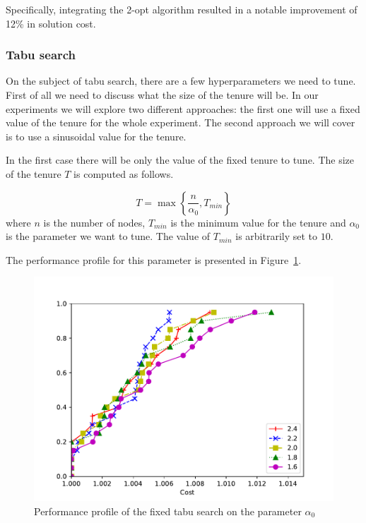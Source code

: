 \documentclass{article}
\begin{document}
Specifically, integrating the 2-opt algorithm resulted in a notable improvement of 12\% in solution cost.

\clearpage

\subsubsection{Tabu search}
On the subject of tabu search, there are a few hyperparameters we need to tune.
First of all we need to discuss what the size of the tenure will be. In our
experiments we will explore two different approaches: the first one will use
a fixed value of the tenure for the whole experiment. The second approach we
will cover is to use a sinusoidal value for the tenure.

In the first case there will be only the value of the fixed tenure to tune.
The size of the tenure $T$ is computed as follows.

\begin{equation*}
        T = \max \left\{
                \frac{n}{\alpha_0} ,
                T_{min}
        \right\}
\end{equation*}
where $n$ is the number of nodes, $T_{min}$ is the minimum value for the tenure
and $\alpha_0$ is the parameter we want to tune. The value of $T_{min}$ is arbitrarily
set to $10$.

The performance profile for this parameter is presented in Figure~\ref{fig:ht_fixten}.

\begin{figure}[ht]
        \caption{Performance profile of the fixed tabu search on the parameter $\alpha_0$}
        \label{fig:ht_fixten}
        \centering
        \includegraphics[width=340pt]{assets/ht_fixten.pdf}
\end{figure}
\end{document}
